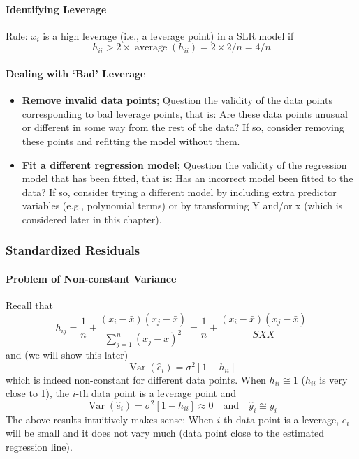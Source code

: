 \documentclass[11pt]{article}
\begin{document}
\paragraph{Identifying Leverage} Rule: $x_i$ is a high leverage (i.e., a leverage point) in a SLR model if 
\begin{equation*}
    h_{i i}>2 \times \operatorname{average}\left(h_{i i}\right)=2 \times 2 / n=4 / n
\end{equation*}

\paragraph{Dealing with `Bad' Leverage}
\begin{itemize}
    \item \textbf{Remove invalid data points;} Question the validity of the data points corresponding to bad leverage points, that is: Are these data points unusual or different in some way from the rest of the data? If so, consider removing these points and refitting the model without them. 
    \item \textbf{Fit a different regression model;} Question the validity of the regression model that has been fitted, that is: Has an incorrect model been fitted to the data? If so, consider trying a different model by including extra predictor variables (e.g., polynomial terms) or by transforming Y and/or x (which is considered later in this chapter).
\end{itemize}

\subsubsection{Standardized Residuals}
\paragraph{Problem of Non-constant Variance} Recall that 
\begin{equation*}
    h_{i j}=\frac{1}{n}+\frac{\left(x_{i}-\bar{x}\right)\left(x_{j}-\bar{x}\right)}{\sum_{j=1}^{n}\left(x_{j}-\bar{x}\right)^{2}}=\frac{1}{n}+\frac{\left(x_{i}-\bar{x}\right)\left(x_{j}-\bar{x}\right)}{S X X}
\end{equation*}
and (we will show this later)
\begin{equation*}
    \operatorname{Var}\left(\hat{e}_{i}\right)=\sigma^{2}\left[1-h_{i i}\right]
\end{equation*}
which is indeed non-constant for different data points. When  $h_{ii} \cong 1$ ($h_{ii}$ is very close to 1), the $i$-th data point is a leverage point and 
\begin{equation*}
    \operatorname{Var}(\hat{e}_i) = \sigma^{2}\left[1-h_{i i}\right] \approx 0 \quad \text{and} \quad \hat{y}_{i} \cong y_{i}
\end{equation*}
The above results intuitively makes sense: When $i$-th data point is a leverage, $\hat{e}_i$ will be small and it does not vary much (data point close to the estimated regression line). 
\end{document}
